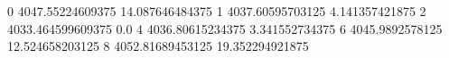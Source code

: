 0 4047.55224609375 14.087646484375
1 4037.60595703125 4.141357421875
2 4033.464599609375 0.0
4 4036.80615234375 3.341552734375
6 4045.9892578125 12.524658203125
8 4052.81689453125 19.352294921875

